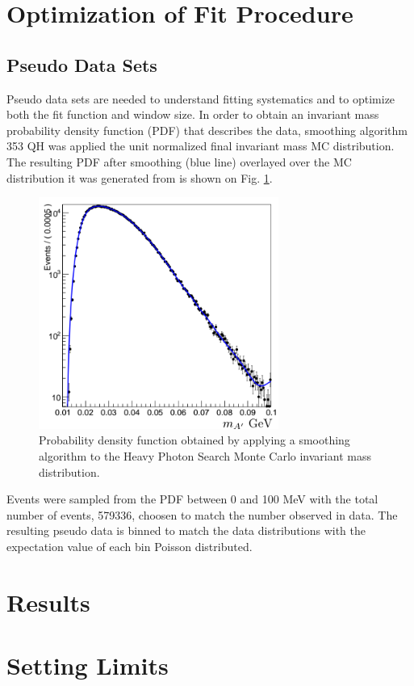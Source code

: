 \section{Optimization of Fit Procedure}

\subsection{Pseudo Data Sets}

Pseudo data sets are needed to understand fitting systematics and to optimize
both
the fit function and window size.  In order to obtain an invariant mass probability
density function (PDF) that describes the data, smoothing algorithm 353 QH 
\cite{Friedman:1974vj} was
applied the unit normalized final invariant mass MC distribution.  The resulting
PDF after smoothing (blue line) overlayed over the MC distribution it was generated 
from is shown on Fig. \ref{fig:smooth_pdf}.
\begin{figure}[b]
    \centering
    \includegraphics[width=0.7\textwidth]{images/smooth_pdf.png}
    \caption{Probability density function obtained by applying a smoothing algorithm 
             to the Heavy Photon Search Monte Carlo invariant mass distribution.}
    \label{fig:smooth_pdf}
\end{figure}
 

Events were sampled from the PDF between 0 and 100 MeV with the total number of
events, 579336, choosen to match the number observed in data.  The resulting
pseudo data is binned to match the data distributions with the expectation
value of each bin Poisson distributed.

\section{Results}

\section{Setting Limits}
